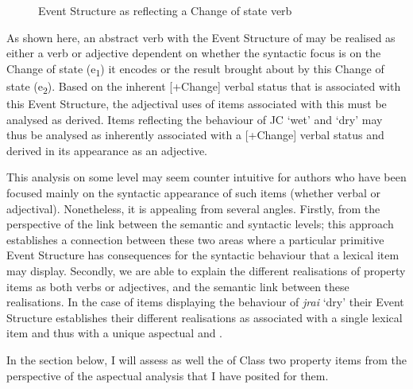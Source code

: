 \begin{figure}
\caption{ Event Structure as reflecting a Change of state verb\label{ex:6:4}}
\end{figure}

As shown here, an abstract verb with the Event Structure of  may be realised as either a verb or adjective dependent on whether the syntactic focus is on the Change of state (e\textsubscript{1}) it encodes or the result brought about by this Change of state (e\textsubscript{2}). Based on the inherent [+Change] verbal status that is associated with this Event Structure, the adjectival uses of items associated with this  must be analysed as derived. Items reflecting the behaviour of JC `wet' and `dry' may thus be analysed as inherently associated with a [+Change] verbal status and derived in its appearance as an adjective.

This analysis on some level may seem counter intuitive for authors who have been focused mainly on the syntactic appearance of such items (whether verbal or adjectival). Nonetheless, it is appealing from several angles. Firstly, from the perspective of the link between the semantic and syntactic levels; this approach establishes a connection between these two areas where a particular primitive Event Structure has consequences for the syntactic behaviour that a lexical item may display. Secondly, we are able to explain the different realisations of property items as both verbs or adjectives, and the semantic link between these realisations. In the case of items displaying the behaviour of \textit{jrai} `dry' their Event Structure establishes their different realisations as associated with a single lexical item and thus with a unique aspectual and . 

In the section below, I will assess as well the  of Class two property items from the perspective of the aspectual analysis that I have posited for them. 


